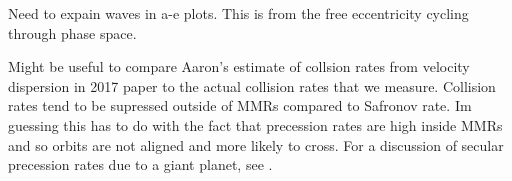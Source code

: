 \documentclass[twocolumn]{aastex63}
\begin{document}
Need to expain waves in a-e plots. This is from the free eccentricity cycling through phase space.

Might be useful to compare Aaron's estimate of collsion rates from velocity dispersion in 2017 paper to the actual collision rates that we measure. Collision rates tend to be supressed outside of MMRs compared to Safronov rate. Im guessing this has to do with the fact that precession rates are high inside MMRs and so orbits are not aligned and more likely to cross. For a discussion of secular precession rates due to a giant planet, see \citet{2009MNRAS.399.1403M}.



\clearpage
\end{document}
